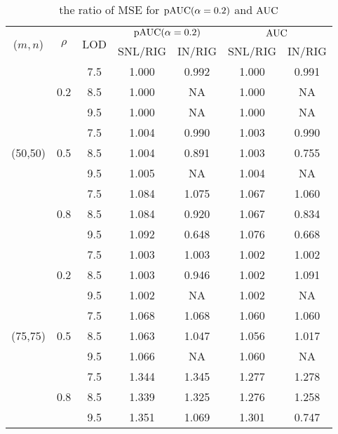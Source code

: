 \documentclass[a4,11pt,epsf, amssymb]{article}
\begin{document}
\begin{table}[htbp]
  \centering
  \caption{the ratio of MSE for $\hbox {pAUC}(\alpha = 0.2)$ and $\hbox {AUC}$}
    \begin{tabular}{c|cccccc}
    \hline
    \multirow{2}[2]{*}{($m,n$)} & \multirow{2}[2]{*}{$\rho$} & \multirow{2}[2]{*}{LOD} & \multicolumn{2}{c}{$\hbox {pAUC}(\alpha = 0.2)$} & \multicolumn{2}{c}{$\hbox {AUC}$} \\
          &       &       & SNL/RIG & IN/RIG & SNL/RIG & IN/RIG \\
    \hline
    \multirow{9}[6]{*}{(50,50)} & \multirow{3}[2]{*}{0.2} & 7.5   & 1.000  & 0.992  & 1.000  & 0.991  \\
          &       & 8.5   & 1.000  & NA    & 1.000  & NA \\
          &       & 9.5   & 1.000  & NA    & 1.000  & NA \\
\cline{2-7}          & \multirow{3}[2]{*}{0.5} & 7.5   & 1.004  & 0.990  & 1.003  & 0.990  \\
          &       & 8.5   & 1.004  & 0.891  & 1.003  & 0.755  \\
          &       & 9.5   & 1.005  & NA    & 1.004  & NA \\
\cline{2-7}          & \multirow{3}[2]{*}{0.8} & 7.5   & 1.084  & 1.075  & 1.067  & 1.060  \\
          &       & 8.5   & 1.084  & 0.920  & 1.067  & 0.834  \\
          &       & 9.5   & 1.092  & 0.648  & 1.076  & 0.668  \\
    \hline
    \multirow{9}[6]{*}{(75,75)} & \multirow{3}[2]{*}{0.2} & 7.5   & 1.003  & 1.003  & 1.002  & 1.002  \\
          &       & 8.5   & 1.003  & 0.946  & 1.002  & 1.091  \\
          &       & 9.5   & 1.002  & NA    & 1.002  & NA \\
\cline{2-7}          & \multirow{3}[2]{*}{0.5} & 7.5   & 1.068  & 1.068  & 1.060  & 1.060  \\
          &       & 8.5   & 1.063  & 1.047  & 1.056  & 1.017  \\
          &       & 9.5   & 1.066  & NA    & 1.060  & NA \\
\cline{2-7}          & \multirow{3}[2]{*}{0.8} & 7.5   & 1.344  & 1.345  & 1.277  & 1.278  \\
          &       & 8.5   & 1.339  & 1.325  & 1.276  & 1.258  \\
          &       & 9.5   & 1.351  & 1.069  & 1.301  & 0.747  \\

\end{tabular}
\end{table}
\end{document}
